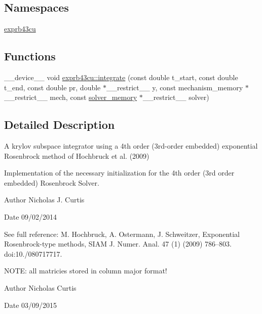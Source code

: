 \subsection*{Namespaces}
\begin{DoxyCompactItemize}
\item 
 \hyperlink{namespaceexprb43cu}{exprb43cu}
\end{DoxyCompactItemize}
\subsection*{Functions}
\begin{DoxyCompactItemize}
\item 
\+\_\+\+\_\+device\+\_\+\+\_\+ void \hyperlink{namespaceexprb43cu_ad98c42138e12fe026951999e87b1ceb4}{exprb43cu\+::integrate} (const double t\+\_\+start, const double t\+\_\+end, const double pr, double $\ast$\+\_\+\+\_\+restrict\+\_\+\+\_\+ y, const mechanism\+\_\+memory $\ast$\+\_\+\+\_\+restrict\+\_\+\+\_\+ mech, const \hyperlink{structsolver__memory}{solver\+\_\+memory} $\ast$\+\_\+\+\_\+restrict\+\_\+\+\_\+ solver)
\end{DoxyCompactItemize}


\subsection{Detailed Description}
A krylov subspace integrator using a 4th order (3rd-\/order embedded) exponential Rosenbrock method of Hochbruck et al. (2009) 

Implementation of the necessary initialization for the 4th order (3rd order embedded) Rosenbrock Solver.

\begin{DoxyAuthor}{Author}
Nicholas J. Curtis 
\end{DoxyAuthor}
\begin{DoxyDate}{Date}
09/02/2014
\end{DoxyDate}
See full reference\+: M. Hochbruck, A. Ostermann, J. Schweitzer, Exponential Rosenbrock-\/type methods, S\+I\+AM J. Numer. Anal. 47 (1) (2009) 786–803. doi\+:10./080717717.

N\+O\+TE\+: all matricies stored in column major format!

\begin{DoxyAuthor}{Author}
Nicholas Curtis 
\end{DoxyAuthor}
\begin{DoxyDate}{Date}
03/09/2015 
\end{DoxyDate}
